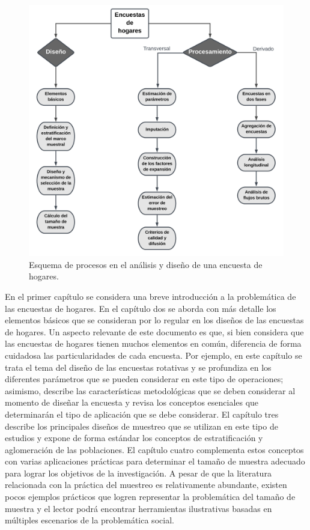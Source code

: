 \documentclass[
  10pt,
  spanish,
]{book}
\begin{document}
\begin{figure}
\includegraphics[width=700px]{Pics/Intro} \caption{Esquema de procesos en el análisis y diseño de una encuesta de hogares.}\label{fig:esquema}
\end{figure}

En el primer capítulo se considera una breve introducción a la problemática de las encuestas de hogares. En el capítulo dos se aborda con más detalle los elementos básicos que se consideran por lo regular en los diseños de las encuestas de hogares. Un aspecto relevante de este documento es que, si bien considera que las encuestas de hogares tienen muchos elementos en común, diferencia de forma cuidadosa las particularidades de cada encuesta. Por ejemplo, en este capítulo se trata el tema del diseño de las encuestas rotativas y se profundiza en los diferentes parámetros que se pueden considerar en este tipo de operaciones; asimismo, describe las características metodológicas que se deben considerar al momento de diseñar la encuesta y revisa los conceptos esenciales que determinarán el tipo de aplicación que se debe considerar. El capítulo tres describe los principales diseños de muestreo que se utilizan en este tipo de estudios y expone de forma estándar los conceptos de estratificación y aglomeración de las poblaciones. El capítulo cuatro complementa estos conceptos con varias aplicaciones prácticas para determinar el tamaño de muestra adecuado para lograr los objetivos de la investigación. A pesar de que la literatura relacionada con la práctica del muestreo es relativamente abundante, existen pocos ejemplos prácticos que logren representar la problemática del tamaño de muestra y el lector podrá encontrar herramientas ilustrativas basadas en múltiples escenarios de la problemática social.
\end{document}
